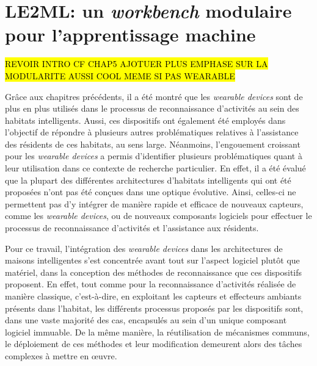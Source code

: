 \chapter{LE2ML: un \textit{workbench} modulaire pour l'apprentissage machine}
\label{chap:6}

\hl{REVOIR INTRO CF CHAP5 AJOTUER PLUS EMPHASE SUR LA MODULARITE AUSSI COOL MEME SI PAS WEARABLE}

Grâce aux chapitres précédents, il a été montré que les \textit{wearable devices} sont de plus en plus utilisés dans le processus de reconnaissance d'activités au sein des habitats intelligents. Aussi, ces dispositifs ont également été employés dans l'objectif de répondre à plusieurs autres problématiques relatives à l'assistance des résidents de ces habitats, au sens large. Néanmoins, l'engouement croissant pour les \textit{wearable devices} a permis d'identifier plusieurs problématiques quant à leur utilisation dans ce contexte de recherche particulier. En effet, il a été évalué que la plupart des différentes architectures d'habitats intelligents qui ont été proposées n'ont pas été conçues dans une optique évolutive. Ainsi, celles-ci ne permettent pas d'y intégrer de manière rapide et efficace de nouveaux capteurs, comme les \textit{wearable devices}, ou de nouveaux composants logiciels pour effectuer le processus de reconnaissance d'activités et l'assistance aux résidents.

Pour ce travail, l'intégration des \textit{wearable devices} dans les architectures de maisons intelligentes s'est concentrée avant tout sur l'aspect logiciel plutôt que matériel, dans la conception des méthodes de reconnaissance que ces dispositifs proposent. En effet, tout comme pour la reconnaissance d'activités réalisée de manière classique, c'est-à-dire, en exploitant les capteurs et effecteurs ambiants présents dans l'habitat, les différents processus proposés par les dispositifs sont, dans une vaste majorité des cas, encapsulés au sein d'un unique composant logiciel immuable. De la même manière, la réutilisation de mécanismes communs, le déploiement de ces méthodes et leur modification demeurent alors des tâches complexes à mettre en \oe{}uvre.

